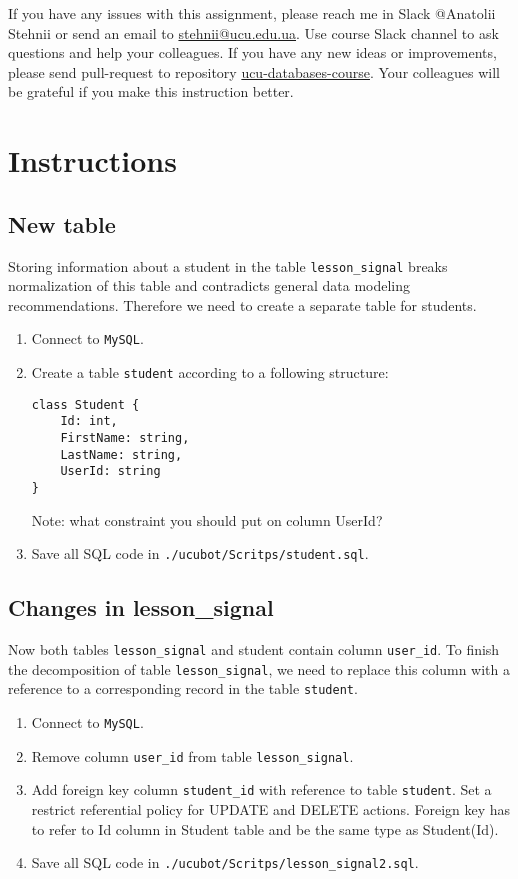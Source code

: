 \documentclass[12pt]{article}
\newcommand{\code}[1]{\texttt{#1}}
\begin{document}
If you have any issues with this assignment, please reach me in Slack @Anatolii Stehnii or send an email to \href{mailto:stehnii@ucu.edu.ua}{stehnii@ucu.edu.ua}. Use course Slack channel to ask questions and help your colleagues. If you have any new ideas or improvements, please send pull-request to repository \href{https://github.com/tsdaemon/ucu-databases-course}{ucu-databases-course}. Your colleagues will be grateful if you make this instruction better.

\section*{Instructions}

\subsection*{New table}

Storing information about a student in the table \code{lesson\_signal} breaks normalization of this table and contradicts general data modeling recommendations. Therefore we need to create a separate table for students.

\begin{enumerate}
\item Connect to \code{MySQL}.
\item Create a table \code{student} according to a following structure:
\begin{verbatim}
class Student {
    Id: int,
    FirstName: string,
    LastName: string,
    UserId: string
}
\end{verbatim}
Note: what constraint you should put on column UserId?
\item Save all SQL code in \break \code{./ucubot/Scritps/student.sql}.
\end{enumerate}

\subsection*{Changes in lesson\_signal}

Now both tables \code{lesson\_signal} and {student} contain column \code{user\_id}. To finish the decomposition of table \code{lesson\_signal}, we need to replace this column with a reference to a corresponding record in the table \code{student}.

\begin{enumerate}

\item Connect to \code{MySQL}.
\item Remove column \code{user\_id} from table \code{lesson\_signal}.
\item Add foreign key column \code{student\_id} with reference to table \code{student}. Set a restrict referential policy for UPDATE and DELETE actions. Foreign key has to refer to Id column in Student table and be the same type as Student(Id).
\item Save all SQL code in \break \code{./ucubot/Scritps/lesson\_signal2.sql}.

\end{enumerate}
\end{document}
